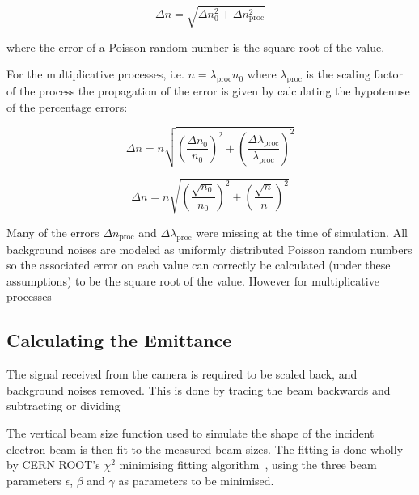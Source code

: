 \begin{equation}
	\Delta n= \sqrt{\Delta n_0^2 + \Delta n_\text{proc}^2}
\end{equation}

where the error of a Poisson random number is the square root of the value.

For the multiplicative processes, i.e. $n = \lambda_\text{proc}n_0 $ where
$\lambda_\text{proc}$ is the scaling factor of the process the propagation of
the error is given by calculating the hypotenuse of the percentage errors:

\begin{equation}
	\Delta n= n \sqrt{
		\left( \frac{\Delta n_0}{n_0} \right)^2 +
		\left( \frac{\Delta \lambda_\text{proc}}{\lambda_\text{proc}} \right)^2}
\end{equation}


\begin{equation}
	\Delta n= n \sqrt{
		\left( \frac{\sqrt{n_0}}{n_0} \right)^2 +
	\left( \frac{\sqrt{n}}{n} \right)^2}
\end{equation}

Many of the errors \(\Delta n_\text{proc}\) and \(\Delta \lambda_\text{proc}\)
were missing at the time of simulation. All background noises are modeled as
uniformly distributed Poisson random numbers so the associated error on each
value can correctly be calculated (under these assumptions) to be the square
root of the value. %
However for multiplicative processes %



\subsection{Calculating the Emittance}

The signal received from the camera is required to be scaled back, and
background noises removed. This is done by tracing the beam backwards and
subtracting or dividing %

The vertical beam size function used to simulate the shape of the incident
electron beam is then fit to the measured beam sizes. The fitting is done wholly
by CERN ROOT's \(\chi^2\) minimising fitting algorithm~\cite{Brun:1997pa}, using
the three beam parameters \(\epsilon\), \(\beta\) and \(\gamma\) as parameters
to be minimised.

